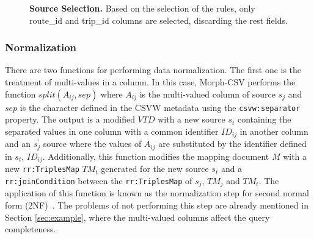 \begin{figure}[ht]
\centering
{}
\caption[Source selection]{\textbf{Source Selection.} Based on the selection of the rules, only route\_id and trip\_id columns are selected, discarding the rest fields.}
\label{fig:selection2}
\end{figure}

\subsubsection*{Normalization}
There are two functions for performing data normalization. The first one is the treatment of multi-values in a column. In this case, Morph-CSV performs the function $split(A_{ij},sep)$ where $A_{ij}$ is the multi-valued column of source $s_{j}$ and $sep$ is the character defined in the CSVW metadata using the \texttt{csvw:separator} property. The output is a modified $VTD$ with a new source $s_t$ containing the separated values in one column with a common identifier $ID_{ij}$ in another column and an $s_{j}^{'}$ source where the values of $A_{ij}$ are substituted by the identifier defined in $s_t$, $ID_{ij}$. Additionally, this function modifies the mapping document $M$ with a new \texttt{rr:TriplesMap} $TM_t$ generated for the new source $s_t$ and a \texttt{rr:joinCondition} between the \texttt{rr:TriplesMap} of $s_j$, $TM_j$ and $TM_t$. The application of this function is known as the normalization step for second normal form (2NF)~\citep{codd1979extending}. The problems of not performing this step are already mentioned in Section \ref{sec:example}, where the multi-valued columns affect  the query completeness.
 
